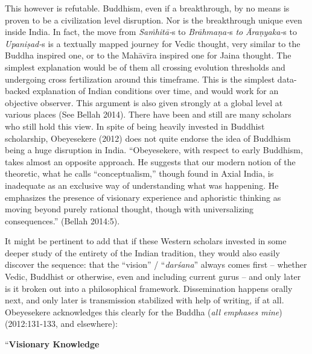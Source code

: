 This however is refutable. Buddhism, even if a breakthrough, by no means is proven to be a civilization level disruption. Nor is the breakthrough unique even inside India. In fact, the move from \textit{Saṁhitā-}s to \textit{Brāhmaṇa-}s \textit{to} \textit{Āraṇyaka-}s to \textit{Upaniṣad-}s is a textually mapped journey for Vedic thought, very similar to the Buddha inspired one, or to the Mahāvīra inspired one for Jaina thought. The simplest explanation would be of them all crossing evolution thresholds and undergoing cross fertilization around this timeframe. This is the simplest data-backed explanation of Indian conditions over time, and would work for an objective observer. This argument is also given strongly at a global level at various places (See Bellah 2014). There have been and still are many scholars who still hold this view. In spite of being heavily invested in Buddhist scholarship, Obeyesekere (2012) does not quite endorse the idea of Buddhism being a huge disruption in India. “Obeyesekere, with respect to early Buddhism, takes almost an opposite approach. He suggests that our modern notion of the theoretic, what he calls “conceptualism,” though found in Axial India, is inadequate as an exclusive way of understanding what was happening. He emphasizes the presence of visionary experience and aphoristic thinking as moving beyond purely rational thought, though with universalizing consequences.” (Bellah 2014:5).

It might be pertinent to add that if these Western scholars invested in some deeper study of the entirety of the Indian tradition, they would also easily discover the sequence: that the “vision” / “\textit{darśana}” always comes first – whether Vedic, Buddhist or otherwise, even and including current gurus – and only later is it broken out into a philosophical framework. Dissemination happens orally next, and only later is transmission stabilized with help of writing, if at all. Obeyesekere acknowledges this clearly for the Buddha (\textit{all emphases mine}) (2012:131-133, and elsewhere):

\begin{myquote}
“\textbf{Visionary Knowledge}
\end{myquote}

